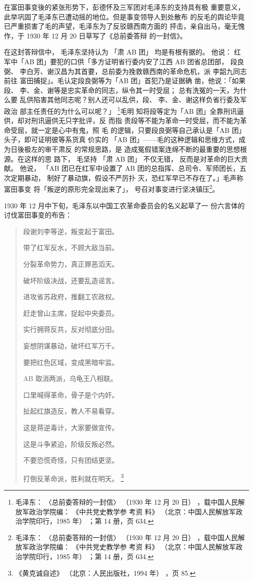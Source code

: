 在富田事变後的紧张形势下，彭德怀及三军团对毛泽东的支持具有极
重要意义，此举巩固了毛泽东已遭动摇的地位。但是事变领导人到处散布
的反毛的舆论毕竟已严重损害了毛的声望，毛泽东为了反驳赣西南方面的
抨击，亲自出马，毫无愧作，于 1930 年 12 月 20 日草写了《总前委答辩
的一封信》。

在这封答辩信中， 毛泽东坚持认为 「肃 AB 团」 均是有根有据的。 他说： 红
军中「AB 团」要犯的口供「多方证明省行委内安了江西 AB 团省总团部， 段良弼、
李白芳、谢汉昌为其首要，总前委为挽救赣西南的革命危机，派 李韶九同志前往
富田捕捉」。毛认定段良弼等为「AB 团」首犯乃是证据确 凿，他说：「如果段、
李、金、谢等是忠实革命的同志，纵令其一时受屈； 总有洗冤的一天，为什么要
乱供陷害其他同志呢？别人还可以乱供，段、 李、金、谢这样负省行委及军政治
部主任责任的为什么可以呢？」 \footnote{ 毛泽东： 〈总前委答辩的一封信〉
（1930 年 12 月 20 日） ，载中国人民解放军政治学院编： 《中共党史教学参
考资 料》 （北京：中国人民解放军政治学院印行，1985 年） ；第 14 册，页
634.}毛明 知将段等定为「AB 团」全靠刑讯逼供，却对刑讯逼供无只字批评，反
而指 责段等不能为革命一时受屈，而不能为革命受屈，就一定是心中有鬼，照 毛
的逻辑，只要段良弼等自己承认是「AB 团」头子，即可证明彼等系货真 价实的
「AB 团」——毛的这种逻辑和思维方式，成为日後极左的审干肃反 的常规思路，是
造成冤假错案连绵不断的最重要的思想根源。在这样的思 路下， 毛坚持 「肃 AB
团」 不仅无错， 反而是对革命的巨大贡献。 他说， 「AB 团已在红军中设置了
AB 团的总指挥、总司令、军师团长，五次定期暴动， 制好了暴动旗，假设不严厉扑
灭，恐红军早已不存在了。」毛声称富田事变 将「叛逆的原形完全现出来了」，
号召对事变进行坚决镇压\footnote{毛泽东： 〈总前委答辩的一封信〉
（1930 年 12 月 20 日） ，载中国人民解放军政治学院编： 《中共党史教学参
考资 料》 （北京：中国人民解放军政治学院印行，1985 年） ；第 14 册，页
634.}。 

1930 年 12 月中下旬，毛泽东以中国工农革命委员会的名义起草了一
份六言体的讨伐富田事变的布告：
\begin{quote}
	\fzwkai 段谢刘李等逆，叛变起于富田。

带了红军反水，不顾大敌当前。

分裂革命势力，真正罪恶滔天。

破坏阶级决战，还要乱造谣言。

进攻省苏政府，推翻工农政权。

赶走曾山主席，捉起中央委员。

实行拥蒋反共，反对彻底分田。

妄想阴谋暴动，破坏红军万千。

要把红色区域，变成黑暗牢监。

AB 取消两派，乌龟王八相联。

口里喊得革命，骨子是个内奸。

扯起红旗造反，教人不易看穿。

这是蒋逆毒计，大家要做宣传。

这是斗争紧迫，阶级反叛必然。

不要恐慌奇怪，只有团结更坚。

打倒反革命派，胜利就在明天。
\footnote{ 《黄克诚自述》
（北京：人民出版社，1994 年）
，页 85.}
\end{quote}

